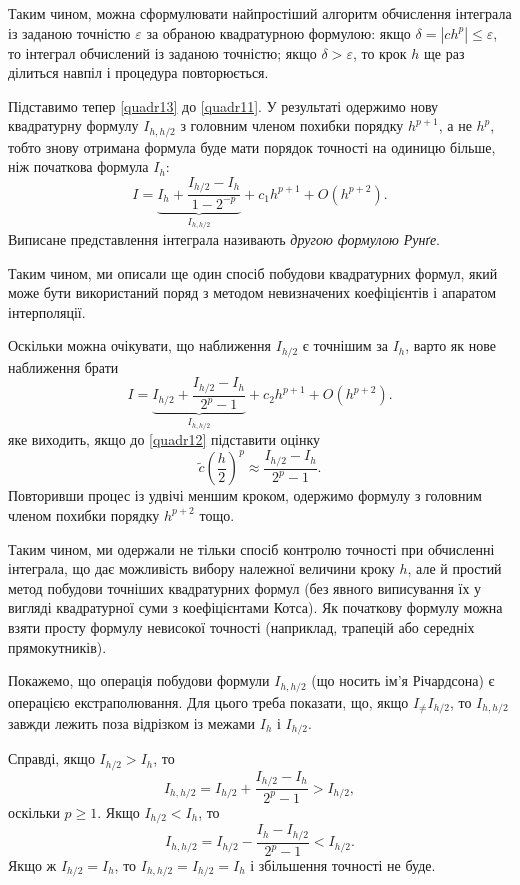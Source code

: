 \documentclass[14pt,twoside]{extreport}
\theoremstyle{mystyle}
\numberwithin{equation}{chapter}
\begin{document}
Таким чином, можна сформулювати найпростіший алгоритм обчислення інтеграла із заданою точністю $\varepsilon$ за обраною квадратурною формулою: якщо $\delta = |ch^p| \leqslant \varepsilon$, то інтеграл
обчислений із заданою точністю; якщо $\delta > \varepsilon$, то крок $h$ ще раз ділиться навпіл і процедура повторюється.

Підставимо тепер \eqref{quadr13} до \eqref{quadr11}. У результаті одержимо нову квадратурну формулу $I_{h,h/2}$ з головним членом похибки порядку $h^{p+1}$, а не $h^{p}$, тобто знову отримана формула буде
мати порядок точності на одиницю більше, ніж початкова формула $I_h$:
\[
I=\underbrace{I_h + \dfrac{I_{h/2}-I_h}{1-2^{-p}}}_{I_{h,h/2}} + c_1 h^{p+1} + O\left(h^{p+2}\right).
\]
Виписане представлення інтеграла називають \emph{другою формулою Рунґе}.

Таким чином, ми описали ще один спосіб побудови квадратурних формул, який може бути використаний поряд з методом невизначених коефіцієнтів і апаратом інтерполяції.

Оскільки можна очікувати, що наближення $I_{h/2}$ є точнішим за $I_h$, варто як нове наближення брати
\begin{equation}\label{quadr14}
I=\underbrace{I_{h/2} + \dfrac{I_{h/2}-I_h}{2^{p}-1}}_{I_{h,h/2}} + c_2 h^{p+1} + O\left(h^{p+2}\right).
\end{equation}
яке виходить, якщо до \eqref{quadr12} підставити оцінку
\[
\tilde{c}\left(\frac{h}{2}\right)^{p}\approx\frac{I_{h/2}-I_{h}}{2^{p}-1}.
\]
Повторивши процес із удвічі меншим кроком, одержимо формулу з головним членом похибки порядку $h^{p+2}$ тощо.

Таким чином, ми одержали не тільки спосіб контролю точності при обчисленні інтеграла, що дає можливість вибору належної величини кроку $h$, але й простий метод побудови точніших квадратурних формул (без явного виписування їх у вигляді квадратурної суми з коефіцієнтами Котса). Як початкову формулу можна взяти просту формулу невисокої точності (наприклад, трапецій або середніх прямокутників).

Покажемо, що операція побудови формули $I_{h,h/2}$ (що носить ім'я Річардсона) є операцією екстраполювання. Для цього треба показати, що, якщо $I_ \neq I_{h/2}$, то $I_{h,h/2}$ завжди лежить поза відрізком із межами $I_h$ і $I_{h/2}$.

Справді, якщо $I_{h/2} > I_h$, то
\[
I_{h,h/2}=I_{h/2}+\frac{I_{h/2}-I_{h}}{2^{p}-1}>I_{h/2},
\]
оскільки $p \geqslant 1$. Якщо $I_{h/2} < I_h$, то
\[
I_{h,h/2}=I_{h/2}-\frac{I_{h}-I_{h/2}}{2^{p}-1}<I_{h/2}.
\]
Якщо ж $I_{h/2} = I_h$, то $I_{h,h/2} = I_{h/2} = I_h$ і збільшення точності не буде.
\end{document}
